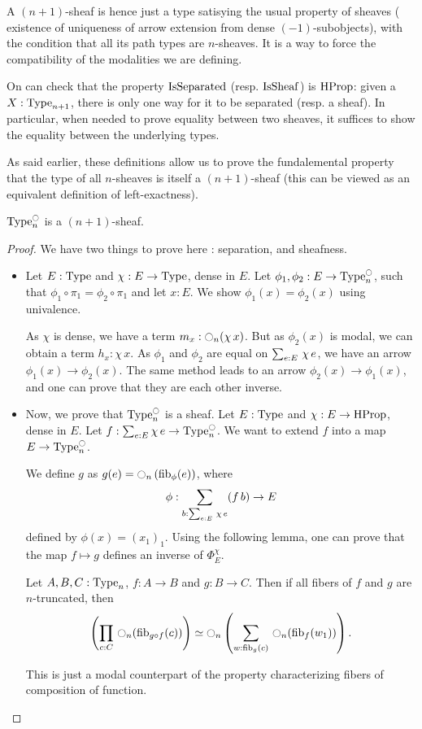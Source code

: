 A $(n+1)$-sheaf is hence just a type satisying the usual property of sheaves
(\ie{} existence of uniqueness of arrow extension from dense
$(-1)$-subobjects), with the condition that all its path types are
$n$-sheaves. It is a way to force the compatibility of the modalities we
are defining.


On can check that the property $\operatorname{IsSeparated}$ (resp. $\operatorname{IsSheaf}$) is $\operatorname{HProp}$:
given a $X:\operatorname{Type}_{n+1}$, there is only one way for it to be separated
(resp. a sheaf). In particular, when needed to prove equality between
two sheaves, it suffices to show the equality between the underlying
types.


As said earlier, these definitions allow us to prove the fundalemental
property that the type of all $n$-sheaves is itself a $(n+1)$-sheaf
(this can be viewed as an equivalent definition of left-exactness).

\begin{prop}\label{prop:sheaf-is-sheaf}
  $\operatorname{Type}_n^{\ocircle}$ is a $(n+1)$-sheaf.
\end{prop}

\begin{proof}
  We have two things to prove here : separation, and sheafness.
  \begin{itemize}
  \item Let $E:\operatorname{Type}$ and $\chi:E\to\operatorname{Type}$, dense in $E$. 
    Let $\phi_1,\phi_2:E \to
    \operatorname{Type}_n^{\ocircle}$, such that $\phi_1 \circ \pi_1 = \phi_2 \circ
    \pi_1$ and let $x:E$. We show $\phi_1(x) = \phi_2(x)$ using
    univalence.
    
    As $\chi$ is dense, we have a term $m_x : \ocircle_n(\chi\, x)$.
    But as $\phi_2(x)$ is modal, we can obtain a term $h_x : \chi\,
    x$. 
    As $\phi_1$ and $\phi_2$ are equal on $\sum_{e:E}\, \chi\, e$, we
    have an arrow $\phi_1(x) \to \phi_2(x)$.
    The same method leads to an arrow $\phi_2 (x) \to \phi_1 (x)$, and
    one can
    prove that they are each other inverse.
  \item Now, we prove that $\operatorname{Type}_n^{\ocircle}$ is a sheaf. Let $E:\operatorname{Type}$ and
  $\chi:E \to \operatorname{HProp}$, dense in $E$. Let $f:\sum_{e:E} \chi\, e \to
  \operatorname{Type}_n^{\ocircle}$. We want to extend $f$ into a map $E \to \operatorname{Type}_n^{\ocircle}$.

  We define $g$ as $g(e) = \ocircle_n \left( \mathrm{fib}_{\phi}(e) \right)$,
  where
  \[ \phi : \sum_{b:\sum_{e:E}\, \chi\, e} (f\,
    b) \to E\]
  defined by $\phi(x) = (x_1)_1$.
  Using the following lemma, one can prove that the map $f\mapsto g$
  defines an inverse of $\Phi_E^\chi$.
  \begin{lem}
    Let $A,B,C:\operatorname{Type}_n$, $f:A\to B$ and $g:B\to C$.
    Then
    if all fibers of $f$ and $g$ are $n$-truncated, then
      \[\left( \prod_{c:C}\, \ocircle_n(\mathrm{fib}_{g \circ f}(c))\right) \simeq
      \ocircle_n \left(  
        \sum_{w:\mathrm{fib}_{g}(c)}\, \ocircle_n (\mathrm{fib}_{f}(w_1))
      \right).\]
  \end{lem}
  \begin{prooflem}
    This is just a modal counterpart of the property characterizing
    fibers of composition of function.
  \end{prooflem}
  \end{itemize}
\end{proof}

